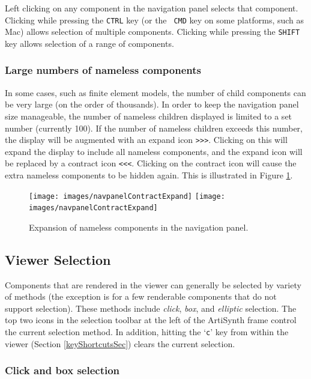 \documentclass{article}
\begin{document}
Left clicking on any component in the navigation panel selects that
component. Clicking while pressing the {\tt CTRL} key (or the {\tt
CMD} key on some platforms, such as Mac) allows selection of multiple
components. Clicking while pressing the {\tt SHIFT} key allows
selection of a range of components.

\subsubsection{Large numbers of nameless components}

In some cases, such as finite element models, the number of child
components can be very large (on the order of thousands). In order to
keep the navigation panel size manageable, the number of nameless
children displayed is limited to a set number (currently 100).  If the
number of nameless children exceeds this number, the display will be
augmented with an expand icon {\tt >>>}. Clicking on this will expand the
display to include all nameless components, and the expand icon will
be replaced by a contract icon {\tt <<<}. Clicking on the contract icon
will cause the extra nameless components to be hidden again.
This is illustrated in Figure \ref{navpanelExpandContractFig}.

\begin{figure}
\begin{center}
\iflatexml
\texttt{[image: images/navpanelContractExpand]}
\else
\texttt{[image: images/navpanelContractExpand]}
\fi
\end{center}
\caption{Expansion of nameless components in the navigation panel.}%
\label{navpanelExpandContractFig}
\end{figure}

\subsection{Viewer Selection}
\label{viewerSelectionSec}

Components that are rendered in the viewer can generally be selected
by variety of methods (the exception is for a few renderable
components that do not support selection). These methods include {\it click},
{\it box}, and {\it elliptic} selection. The top two icons in the
selection toolbar at the left of the ArtiSynth frame control the
current selection method. In addition, hitting the `{\tt c}' key
from within the viewer
(Section \ref{keyShortcutsSec}) clears the current selection.

\subsubsection{Click and box selection}
\end{document}
